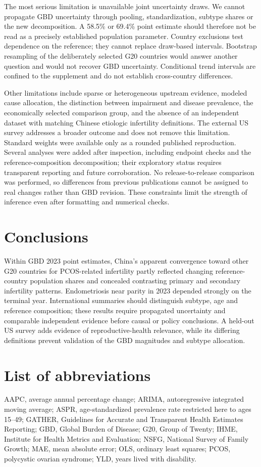 \documentclass[11pt,a4paper]{article}
\begin{document}
The most serious limitation is unavailable joint uncertainty draws. We cannot propagate GBD uncertainty through pooling, standardization, subtype shares or the new decomposition. A 58.5\% or 69.4\% point estimate should therefore not be read as a precisely established population parameter. Country exclusions test dependence on the reference; they cannot replace draw-based intervals. Bootstrap resampling of the deliberately selected G20 countries would answer another question and would not recover GBD uncertainty. Conditional trend intervals are confined to the supplement and do not establish cross-country differences.

Other limitations include sparse or heterogeneous upstream evidence, modeled cause allocation, the distinction between impairment and disease prevalence, the economically selected comparison group, and the absence of an independent dataset with matching Chinese etiologic infertility definitions. The external US survey addresses a broader outcome and does not remove this limitation. Standard weights were available only as a rounded published reproduction. Several analyses were added after inspection, including endpoint checks and the reference-composition decomposition; their exploratory status requires transparent reporting and future corroboration. No release-to-release comparison was performed, so differences from previous publications cannot be assigned to real changes rather than GBD revision. These constraints limit the strength of inference even after formatting and numerical checks.

\section{Conclusions}
Within GBD 2023 point estimates, China's apparent convergence toward other G20 countries for PCOS-related infertility partly reflected changing reference-country population shares and concealed contrasting primary and secondary infertility patterns. Endometriosis near parity in 2023 depended strongly on the terminal year. International summaries should distinguish subtype, age and reference composition; these results require propagated uncertainty and comparable independent evidence before causal or policy conclusions. A held-out US survey adds evidence of reproductive-health relevance, while its differing definitions prevent validation of the GBD magnitudes and subtype allocation.

\section*{List of abbreviations}
AAPC, average annual percentage change; ARIMA, autoregressive integrated moving average; ASPR, age-standardized prevalence rate restricted here to ages 15--49; GATHER, Guidelines for Accurate and Transparent Health Estimates Reporting; GBD, Global Burden of Disease; G20, Group of Twenty; IHME, Institute for Health Metrics and Evaluation; NSFG, National Survey of Family Growth; MAE, mean absolute error; OLS, ordinary least squares; PCOS, polycystic ovarian syndrome; YLD, years lived with disability.
\end{document}
